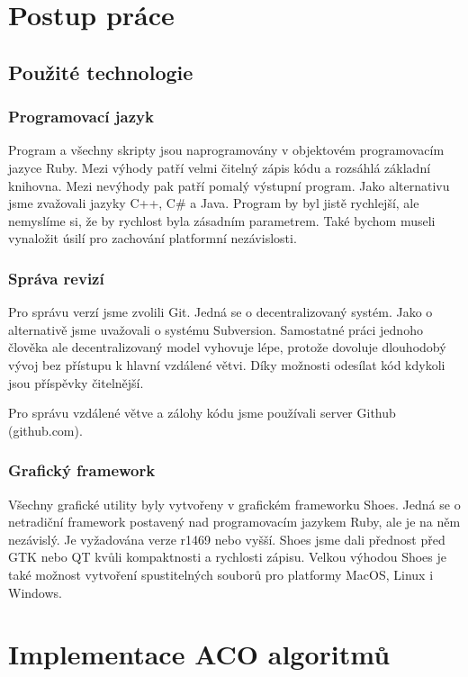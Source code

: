 \documentclass[12pt]{article}
\begin{document}
\section{Postup práce}
\subsection{Použité technologie}
\subsubsection{Programovací jazyk}
Program a všechny skripty jsou naprogramovány v objektovém programovacím jazyce Ruby. Mezi výhody patří velmi čitelný zápis kódu a rozsáhlá základní knihovna. Mezi nevýhody pak patří pomalý výstupní program. Jako alternativu jsme zvažovali jazyky C++, C\# a Java. Program by byl jistě rychlejší, ale nemyslíme si, že by rychlost byla zásadním parametrem. Také bychom museli vynaložit úsilí pro zachování platformní nezávislosti. \nocite{pickaxe} \nocite{fields2010}

\subsubsection{Správa revizí}
Pro správu verzí jsme zvolili Git. Jedná se o decentralizovaný systém. Jako o alternativě jsme uvažovali o systému Subversion. Samostatné práci jednoho člověka ale decentralizovaný model vyhovuje lépe, protože dovoluje dlouhodobý vývoj bez přístupu k hlavní vzdálené větvi. Díky možnosti odesílat k\'{o}d kdykoli jsou příspěvky čitelnější. \nocite{chacon2009} 

Pro správu vzdálené větve a zálohy k\'{o}du jsme používali server Github (github.com). 

\subsubsection{Grafický framework}
Všechny grafické utility byly vytvořeny v grafickém frameworku Shoes. Jedná se o netradiční framework postavený nad programovacím jazykem Ruby, ale je na něm nezávislý. Je vyžadována verze r1469 nebo vyšší. Shoes jsme dali přednost před GTK nebo QT kvůli kompaktnosti a rychlosti zápisu. Velkou výhodou Shoes je také možnost vytvoření spustitelných souborů pro platformy MacOS, Linux i Windows. \cite{shoeshome}

\section{Implementace ACO algoritmů}
\end{document}
